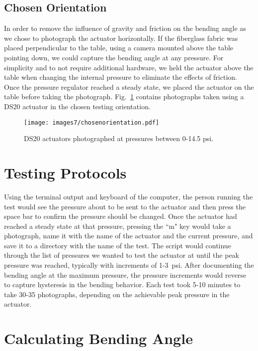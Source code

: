 \clearpage
\subsection{Chosen Orientation}

In order to remove the influence of gravity and friction on the bending angle as we chose to photograph the actuator horizontally. If the fiberglass fabric was placed perpendicular to the table, using a camera mounted above the table pointing down, we could capture the bending angle at any pressure. For simplicity and to not require additional hardware, we held the actuator above the table when changing the internal pressure to eliminate the effects of friction. Once the pressure regulator reached a steady state, we placed the actuator on the table before taking the photograph. Fig.~\ref{fig:chosenorientation} contains photographs taken using a DS20 actuator in the chosen testing orientation. 

\begin{figure}[!ht]
    \centering
    \texttt{[image: images7/chosenorientation.pdf]}
    \caption{DS20 actuators photographed at pressures between 0-14.5 psi.}
    \label{fig:chosenorientation}
\end{figure}

\clearpage
\section{Testing Protocols}

Using the terminal output and keyboard of the computer, the person running the test would see the pressure about to be sent to the actuator and then press the space bar to confirm the pressure should be changed. Once the actuator had reached a steady state at that pressure, pressing the ``m" key would take a photograph, name it with the name of the actuator and the current pressure, and save it to a directory with the name of the test. The script would continue through the list of pressures we wanted to test the actuator at until the peak pressure was reached, typically with increments of 1-3~psi. After documenting the bending angle at the maximum pressure, the pressure increments would reverse to capture hysteresis in the bending behavior. Each test took 5-10 minutes to take 30-35 photographs, depending on the achievable peak pressure in the actuator.

\section{Calculating Bending Angle}

